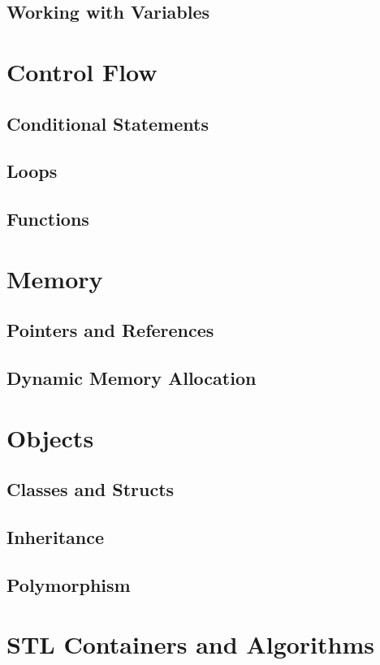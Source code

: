 \documentclass[11pt,fancy,authoryear]{elegantbook}
\begin{document}
\section{Working with Variables}

\chapter{Control Flow}

\section{Conditional Statements}

\section{Loops}

\section{Functions}

\chapter{Memory}

\section{Pointers and References}

\section{Dynamic Memory Allocation}

\chapter{Objects}

\section{Classes and Structs}

\section{Inheritance}

\section{Polymorphism}

\chapter{STL Containers and Algorithms}
\end{document}

